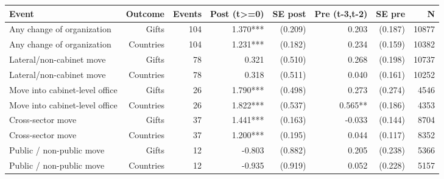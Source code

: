 \begin{tabular}{lrrrrrrr}
\toprule
Event & Outcome & Events & Post (t>=0) & SE post & Pre (t-3,t-2) & SE pre & N \\
\midrule
Any change of organization & Gifts & 104 & 1.370*** & (0.209) & 0.203 & (0.187) & 10877 \\
Any change of organization & Countries & 104 & 1.231*** & (0.182) & 0.234 & (0.159) & 10382 \\
Lateral/non-cabinet move & Gifts & 78 & 0.321 & (0.510) & 0.268 & (0.198) & 10737 \\
Lateral/non-cabinet move & Countries & 78 & 0.318 & (0.511) & 0.040 & (0.161) & 10252 \\
Move into cabinet-level office & Gifts & 26 & 1.790*** & (0.498) & 0.273 & (0.274) & 4546 \\
Move into cabinet-level office & Countries & 26 & 1.822*** & (0.537) & 0.565** & (0.186) & 4353 \\
Cross-sector move & Gifts & 37 & 1.441*** & (0.163) & -0.033 & (0.144) & 8704 \\
Cross-sector move & Countries & 37 & 1.200*** & (0.195) & 0.044 & (0.117) & 8352 \\
Public / non-public move & Gifts & 12 & -0.803 & (0.882) & 0.205 & (0.238) & 5366 \\
Public / non-public move & Countries & 12 & -0.935 & (0.919) & 0.052 & (0.228) & 5157 \\
\bottomrule
\end{tabular}
\par{}

